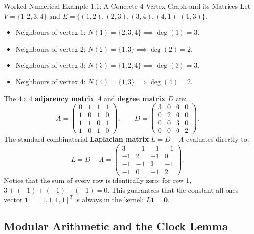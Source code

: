 \documentclass[11pt]{article}
\begin{document}
\begin{callbox}{Worked Numerical Example 1.1: A Concrete 4-Vertex Graph and its Matrices}
Let $V = \{1, 2, 3, 4\}$ and $E = \{(1,2), (2,3), (3,4), (4,1), (1,3)\}$.
\begin{itemize}[leftmargin=*,nosep]
  \item Neighbours of vertex 1: $N(1) = \{2, 3, 4\} \implies \deg(1) = 3$.
  \item Neighbours of vertex 2: $N(2) = \{1, 3\} \implies \deg(2) = 2$.
  \item Neighbours of vertex 3: $N(3) = \{1, 2, 4\} \implies \deg(3) = 3$.
  \item Neighbours of vertex 4: $N(4) = \{1, 3\} \implies \deg(4) = 2$.
\end{itemize}
The $4 \times 4$ \textbf{adjacency matrix} $A$ and \textbf{degree matrix} $D$ are:
\begin{equation}
  A = \begin{pmatrix}
    0 & 1 & 1 & 1 \\
    1 & 0 & 1 & 0 \\
    1 & 1 & 0 & 1 \\
    1 & 0 & 1 & 0
  \end{pmatrix}, \qquad
  D = \begin{pmatrix}
    3 & 0 & 0 & 0 \\
    0 & 2 & 0 & 0 \\
    0 & 0 & 3 & 0 \\
    0 & 0 & 0 & 2
  \end{pmatrix}.
\end{equation}
The standard combinatorial \textbf{Laplacian matrix} $L = D - A$ evaluates directly to:
\begin{equation}
  L = D - A = \begin{pmatrix}
    3 & -1 & -1 & -1 \\
    -1 & 2 & -1 & 0 \\
    -1 & -1 & 3 & -1 \\
    -1 & 0 & -1 & 2
  \end{pmatrix}.
\end{equation}
Notice that the sum of every row is identically zero: for row 1, $3 + (-1) + (-1) + (-1) = 0$. 
This guarantees that the constant all-ones vector $\mathbf{1} = [1, 1, 1, 1]^T$ is always in the kernel: $L \mathbf{1} = \mathbf{0}$.
\end{callbox}

\subsection{Modular Arithmetic and the Clock Lemma}
\end{document}
